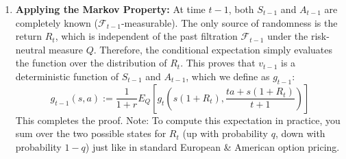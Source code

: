 \begin{enumerate}
    \item \textbf{Applying the Markov Property:}
    At time $t-1$, both $S_{t-1}$ and $A_{t-1}$ are completely known ($\mathcal{F}_{t-1}$-measurable). The only source of randomness is the return $R_t$, which is independent of the past filtration $\mathcal{F}_{t-1}$ under the risk-neutral measure $Q$. 
    Therefore, the conditional expectation simply evaluates the function over the distribution of $R_t$. This proves that $v_{t-1}$ is a deterministic function of $S_{t-1}$ and $A_{t-1}$, which we define as $g_{t-1}$:
    \begin{equation*}
        g_{t-1}(s, a) := \frac{1}{1+r} E_Q\left[ g_t\left(s(1+R_t), \frac{ta + s(1+R_t)}{t+1}\right) \right]
    \end{equation*}
    This completes the proof. Note: To compute this expectation in practice, you sum over the two possible states for $R_t$ (up with probability $q$, down with probability $1-q$) just like in standard European \& American option pricing.
\end{enumerate}